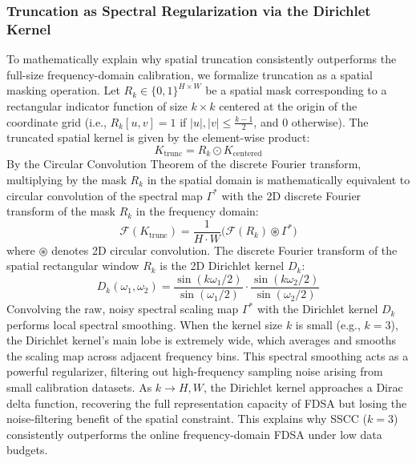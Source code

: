 \documentclass{article}
\theoremstyle{plain}
\theoremstyle{definition}
\theoremstyle{remark}
\begin{document}
\subsubsection{Truncation as Spectral Regularization via the Dirichlet Kernel}
To mathematically explain why spatial truncation consistently outperforms the full-size frequency-domain calibration, we formalize truncation as a spatial masking operation. Let $R_k \in \{0, 1\}^{H \times W}$ be a spatial mask corresponding to a rectangular indicator function of size $k \times k$ centered at the origin of the coordinate grid (i.e., $R_k[u, v] = 1$ if $|u|, |v| \le \frac{k-1}{2}$, and $0$ otherwise). The truncated spatial kernel is given by the element-wise product:
\begin{equation}
    K_{\text{trunc}} = R_k \odot K_{\text{centered}}
\end{equation}
By the Circular Convolution Theorem of the discrete Fourier transform, multiplying by the mask $R_k$ in the spatial domain is mathematically equivalent to circular convolution of the spectral map $\Gamma^*$ with the 2D discrete Fourier transform of the mask $R_k$ in the frequency domain:
\begin{equation}
    \mathcal{F}(K_{\text{trunc}}) = \frac{1}{H \cdot W} \Big( \mathcal{F}(R_k) \circledast \Gamma^* \Big)
\end{equation}
where $\circledast$ denotes 2D circular convolution. The discrete Fourier transform of the spatial rectangular window $R_k$ is the 2D Dirichlet kernel $D_k$:
\begin{equation}
    D_k(\omega_1, \omega_2) = \frac{\sin(k \omega_1 / 2)}{\sin(\omega_1 / 2)} \cdot \frac{\sin(k \omega_2 / 2)}{\sin(\omega_2 / 2)}
\end{equation}
Convolving the raw, noisy spectral scaling map $\Gamma^*$ with the Dirichlet kernel $D_k$ performs local spectral smoothing. When the kernel size $k$ is small (e.g., $k=3$), the Dirichlet kernel's main lobe is extremely wide, which averages and smooths the scaling map across adjacent frequency bins. This spectral smoothing acts as a powerful regularizer, filtering out high-frequency sampling noise arising from small calibration datasets. As $k \to H, W$, the Dirichlet kernel approaches a Dirac delta function, recovering the full representation capacity of FDSA but losing the noise-filtering benefit of the spatial constraint. This explains why SSCC ($k=3$) consistently outperforms the online frequency-domain FDSA under low data budgets.
\end{document}
